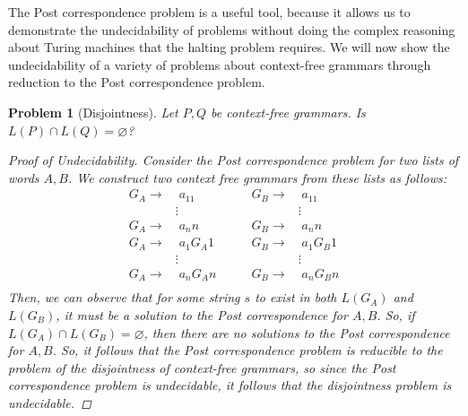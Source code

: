 \documentclass[psamsfonts]{amsart}
\newtheorem{prob}[thm]{Problem}
\theoremstyle{definition}
\theoremstyle{remark}
\numberwithin{equation}{section}
\begin{document}
The Post correspondence problem is a useful tool, because it allows us to
demonstrate the undecidability of problems without doing the complex reasoning
about Turing machines that the halting problem requires. We will now show the
undecidability of a variety of problems about context-free grammars through
reduction to the Post correspondence problem.

\begin{prob}[Disjointness]
  Let $P,Q$ be context-free grammars. Is $L(P)\cap L(Q) = \varnothing$?
  \begin{proof}[Proof of Undecidability]
    Consider the Post correspondence problem for two lists of words $A,B$. We
    construct two context free grammars from these lists as follows:
    \begin{equation*}
      \begin{split}
        G_A \rightarrow  &\;a_11 \\
        &\!\!\!\!\vdots \\
        G_A \rightarrow  &\;a_nn \\
        G_A \rightarrow  &\;a_1G_A1 \\
        &\!\!\!\!\vdots \\
        G_A \rightarrow  &\;a_nG_An \\
      \end{split}
      \qquad
      \begin{split}
        G_B \rightarrow  &\;a_11 \\
        &\!\!\!\!\vdots \\
        G_B \rightarrow  &\;a_nn \\
        G_B \rightarrow  &\;a_1G_B1 \\
        &\!\!\!\!\vdots \\
        G_B \rightarrow  &\;a_nG_Bn \\
      \end{split}
    \end{equation*}
    Then, we can observe that for some string $s$ to exist in both $L(G_A)$ and $L(G_B)$,
    it must be a solution to the Post correspondence for $A,B$. So, if $L(G_A)\cap
    L(G_B)=\varnothing$, then there are no solutions to the Post correspondence
    for $A,B$. So, it follows that the Post correspondence problem is reducible
    to the problem of the disjointness of context-free grammars, so since the
    Post correspondence problem is undecidable, it follows that the disjointness
    problem is undecidable.
  \end{proof}
\end{prob}
\end{document}

